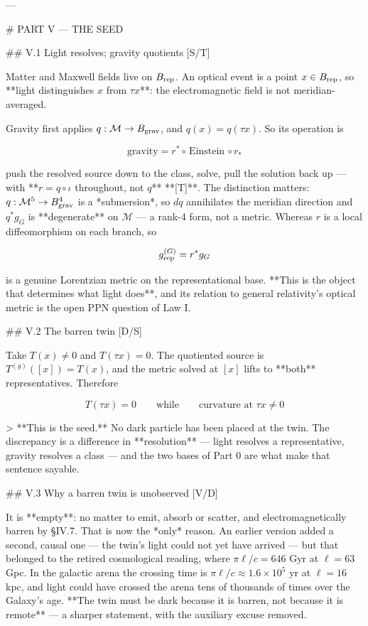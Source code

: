 ---

# PART V — THE SEED

## V.1 Light resolves; gravity quotients [S/T]

Matter and Maxwell fields live on $B_{\rm rep}$. An optical event is a point $x\in B_{\rm rep}$, so **light distinguishes $x$ from $\tau x$**: the electromagnetic field is not meridian-averaged.

Gravity first applies $q:\mathcal{M}\to B_{\rm grav}$, and $q(x) = q(\tau x)$. So its operation is

$$\text{gravity} = r^*\circ\,\text{Einstein}\,\circ r_*$$

push the resolved source down to the class, solve, pull the solution back up — with **$r = q\circ\iota$ throughout, not $q$** **[T]**. The distinction matters: $q:\mathcal{M}^5\to B_{\rm grav}^4$ is a *submersion*, so $dq$ annihilates the meridian direction and $q^*g_G$ is **degenerate** on $\mathcal{M}$ — a rank-4 form, not a metric. Whereas $r$ is a local diffeomorphism on each branch, so

$$g^{(G)}_{\rm rep} = r^*g_G$$

is a genuine Lorentzian metric on the representational base. **This is the object that determines what light does**, and its relation to general relativity's optical metric is the open PPN question of Law I.

## V.2 The barren twin [D/S]

Take $T(x)\neq0$ and $T(\tau x) = 0$. The quotiented source is $T^{(g)}([x]) = T(x)$, and the metric solved at $[x]$ lifts to **both** representatives. Therefore

$$T(\tau x) = 0\qquad\text{while}\qquad \text{curvature at }\tau x\neq0$$

> **This is the seed.** No dark particle has been placed at the twin. The discrepancy is a difference in **resolution** — light resolves a representative, gravity resolves a class — and the two bases of Part 0 are what make that sentence sayable.

## V.3 Why a barren twin is unobserved [V/D]

It is **empty**: no matter to emit, absorb or scatter, and electromagnetically barren by §IV.7. That is now the *only* reason. An earlier version added a second, causal one — the twin's light could not yet have arrived — but that belonged to the retired cosmological reading, where $\pi\ell/c = 646$ Gyr at $\ell = 63$ Gpc. In the galactic arena the crossing time is $\pi\ell/c\approx1.6\times10^5$ yr at $\ell = 16$ kpc, and light could have crossed the arena tens of thousands of times over the Galaxy's age. **The twin must be dark because it is barren, not because it is remote** — a sharper statement, with the auxiliary excuse removed.


